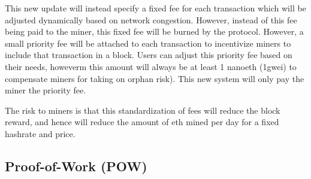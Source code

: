 \documentclass[a4paper,11pt]{article}
\begin{document}
This new update will instead specify a fixed fee for each transaction which will be adjusted dynamically based on network congestion. However, instead of this fee being paid to the miner, this fixed fee will be burned by the protocol. However, a small priority fee will be attached to each transaction to incentivize miners to include that transaction in a block. Users can adjust this priority fee based on their needs, howeverm this amount will always be at least 1 nanoeth (1gwei) to compensate miners for taking on orphan risk). This new system will only pay the miner the priority fee. 

The risk to miners is that this standardization of fees will reduce the block reward, and hence will reduce the amount of eth mined per day for a fixed hashrate and price. 
\vspace{-10pt}
\subsection{Proof-of-Work (POW)}
\end{document}
